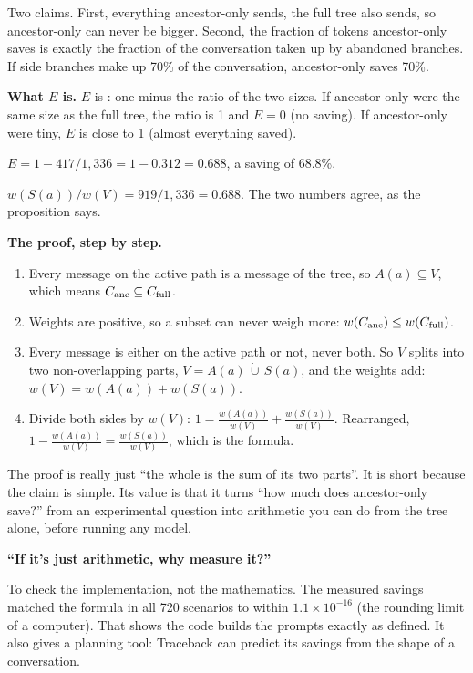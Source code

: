 \begin{plain}
Two claims. First, everything ancestor-only sends, the full tree also sends, so ancestor-only can never be bigger. Second, the fraction of tokens ancestor-only saves is exactly the fraction of the conversation taken up by abandoned branches. If side branches make up 70\% of the conversation, ancestor-only saves 70\%.
\end{plain}

\textbf{What $E$ is.} $E$ is : one minus the ratio of the two sizes. If ancestor-only were the same size as the full tree, the ratio is 1 and $E = 0$ (no saving). If ancestor-only were tiny, $E$ is close to 1 (almost everything saved).

\begin{example}
$E = 1 - 417/1{,}336 = 1 - 0.312 = 0.688$, a saving of 68.8\%.\par
$w(S(a))/w(V) = 919/1{,}336 = 0.688$. The two numbers agree, as the proposition says.
\end{example}

\textbf{The proof, step by step.}
\begin{enumerate}
\item Every message on the active path is a message of the tree, so $A(a) \subseteq V$, which means $C_{\mathrm{anc}} \subseteq C_{\mathrm{full}}$.
\item Weights are positive, so a subset can never weigh more: $w(C_{\mathrm{anc}}) \le w(C_{\mathrm{full}})$.
\item Every message is either on the active path or not, never both. So $V$ splits into two non-overlapping parts, $V = A(a) \,\dot\cup\, S(a)$, and the weights add: $w(V) = w(A(a)) + w(S(a))$.
\item Divide both sides by $w(V)$: $1 = \frac{w(A(a))}{w(V)} + \frac{w(S(a))}{w(V)}$. Rearranged, $1 - \frac{w(A(a))}{w(V)} = \frac{w(S(a))}{w(V)}$, which is the formula.
\end{enumerate}

\begin{plain}
The proof is really just ``the whole is the sum of its two parts''. It is short because the claim is simple. Its value is that it turns ``how much does ancestor-only save?'' from an experimental question into arithmetic you can do from the tree alone, before running any model.
\end{plain}

\begin{ask}
\textbf{``If it's just arithmetic, why measure it?''}\par
To check the implementation, not the mathematics. The measured savings matched the formula in all 720 scenarios to within $1.1 \times 10^{-16}$ (the rounding limit of a computer). That shows the code builds the prompts exactly as defined. It also gives a planning tool: Traceback can predict its savings from the shape of a conversation.
\end{ask}

